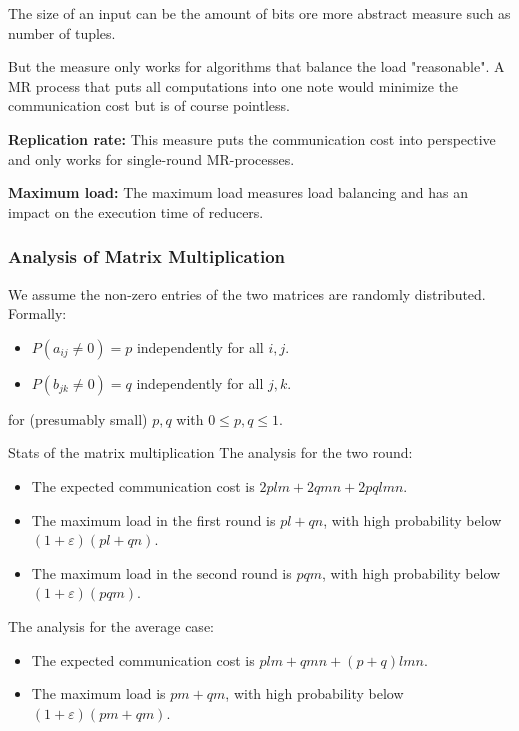\documentclass[english]{panikzettel}
\begin{document}
The size of an input can be the amount of bits ore more abstract measure such as number of tuples.

But the measure only works for algorithms that balance the load "reasonable". A MR process that puts all computations into one note would minimize the communication cost but is of course pointless.

\textbf{Replication rate:} This measure puts the communication cost into perspective and only works for single-round MR-processes.

\textbf{Maximum load:} The maximum load measures load balancing and has an impact on the execution time of reducers.


\subsubsection{Analysis of Matrix Multiplication}
We assume the non-zero entries of the two matrices are randomly distributed.
Formally:
\begin{itemize}
\item $P(a_{ij}\neq 0)=p$ independently for all $i,j$.
\item $P(b_{jk}\neq 0)=q$ independently for all $j,k$.
\end{itemize}
for (presumably small) $p, q$ with $0 \leq p, q \leq 1$.

\begin{theo}{Stats of the matrix multiplication}
The analysis for the two round:
\begin{itemize}[leftmargin=*]
	\item The expected communication cost is $2plm + 2qmn + 2pqlmn$.
	\item The maximum load in the first round is $pl + qn$, with high probability below $(1 + \varepsilon)(pl + qn)$.
	\item The maximum load in the second round is $pqm$, with high probability below $(1 + \varepsilon)(pqm)$.
\end{itemize}
The analysis for the average case:
\begin{itemize}[leftmargin=*]
	\item The expected communication cost is $plm + qmn + (p+q)lmn$.
	\item The maximum load is $pm + qm$, with high probability below $(1 + \varepsilon)(pm + qm)$.
\end{itemize}
\end{theo}
\end{document}
